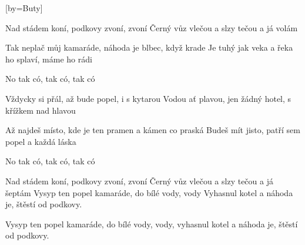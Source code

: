 [by={Buty}]

\beginverse{}
Nad stádem koní, podkovy zvoní, zvoní
Černý vůz vlečou a slzy tečou a já volám
\endverse{}

\beginverse{}
Tak neplač můj kamaráde, náhoda je blbec, když krade
Je tuhý jak veka a řeka ho splaví, máme ho rádi
\endverse{}

\beginchorus{}
No tak có, tak có, tak có
\endchorus{}

\beginverse{}
Vždycky si přál, až bude popel, i s kytarou
Vodou ať plavou, jen žádný hotel, s křížkem nad hlavou
\endverse{}

\beginverse{}
Až najdeš místo, kde je ten pramen a kámen co praská
Budeš mít jisto, patří sem popel a každá láska
\endverse{}

\repeatingchorus{}
\beginchorus{}
No tak có, tak có, tak có
\endchorus{}

\beginverse{}
Nad stádem koní, podkovy zvoní, zvoní
Černý vůz vlečou a slzy tečou a já šeptám
Vysyp ten popel kamaráde, do bílé vody, vody 
Vyhasnul kotel a náhoda je, štěstí od podkovy.
\endverse{}

\beginverse{}
\lrep{} Vysyp ten popel kamaráde, do bílé vody, vody,
vyhasnul kotel a náhoda je, štěstí od podkovy. \rrep{}
\endverse{}

\endsong{}
